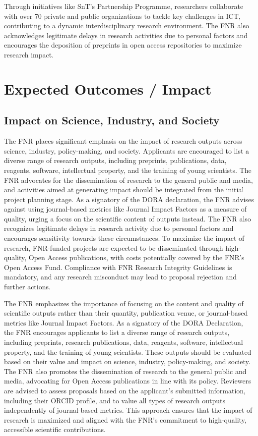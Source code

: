 \documentclass[12pt]{article}
\begin{document}
Through initiatives like SnT’s Partnership Programme, researchers collaborate with over 70 private and public organizations to tackle key challenges in ICT, contributing to a dynamic interdisciplinary research environment. The FNR also acknowledges legitimate delays in research activities due to personal factors and encourages the deposition of preprints in open access repositories to maximize research impact.

\section{Expected Outcomes / Impact}

\subsection{Impact on Science, Industry, and Society}

The FNR places significant emphasis on the impact of research outputs across science, industry, policy-making, and society. Applicants are encouraged to list a diverse range of research outputs, including preprints, publications, data, reagents, software, intellectual property, and the training of young scientists. The FNR advocates for the dissemination of research to the general public and media, and activities aimed at generating impact should be integrated from the initial project planning stage. As a signatory of the DORA declaration, the FNR advises against using journal-based metrics like Journal Impact Factors as a measure of quality, urging a focus on the scientific content of outputs instead. The FNR also recognizes legitimate delays in research activity due to personal factors and encourages sensitivity towards these circumstances. To maximize the impact of research, FNR-funded projects are expected to be disseminated through high-quality, Open Access publications, with costs potentially covered by the FNR’s Open Access Fund. Compliance with FNR Research Integrity Guidelines is mandatory, and any research misconduct may lead to proposal rejection and further actions.

The FNR emphasizes the importance of focusing on the content and quality of scientific outputs rather than their quantity, publication venue, or journal-based metrics like Journal Impact Factors. As a signatory of the DORA Declaration, the FNR encourages applicants to list a diverse range of research outputs, including preprints, research publications, data, reagents, software, intellectual property, and the training of young scientists. These outputs should be evaluated based on their value and impact on science, industry, policy-making, and society. The FNR also promotes the dissemination of research to the general public and media, advocating for Open Access publications in line with its policy. Reviewers are advised to assess proposals based on the applicant's submitted information, including their ORCID profile, and to value all types of research outputs independently of journal-based metrics. This approach ensures that the impact of research is maximized and aligned with the FNR's commitment to high-quality, accessible scientific contributions.
\end{document}
